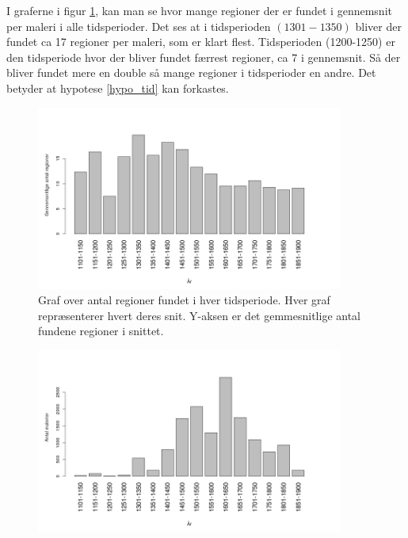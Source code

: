 I graferne i figur \ref{naiv_year}, kan man se hvor mange regioner der
er fundet i gennemsnit per maleri i alle tidsperioder. Det ses at i
tidsperioden $(1301-1350)$ bliver der fundet ca 17 regioner per maleri,
som er klart flest. Tidsperioden (1200-1250) er den tidsperiode hvor der
bliver fundet færrest regioner, ca 7 i gennemsnit. Så der bliver fundet
mere en double så mange regioner i tidsperioder en andre. Det betyder at
hypotese \ref{hypo_tid} kan forkastes.

\begin{figure}[!h]
	\begin{center}
		\includegraphics[angle=0,width=0.90\textwidth]{afsnit/resultater/billeder/yearcut.png}
	\end{center}
	\caption{Graf over antal regioner fundet i hver
       tidsperiode. Hver graf repræsenterer hvert deres snit. Y-aksen er
       det gemmesnitlige antal fundene regioner i snittet.}
	\label{naiv_year}
\end{figure}

\begin{figure}[!h]
	\begin{center}
		\includegraphics[angle=0,width=0.90\textwidth]{afsnit/resultater/billeder/yearNrImage.png}
	\end{center}
	\caption{}
	\label{naiv_yearNrImage}
\end{figure}


